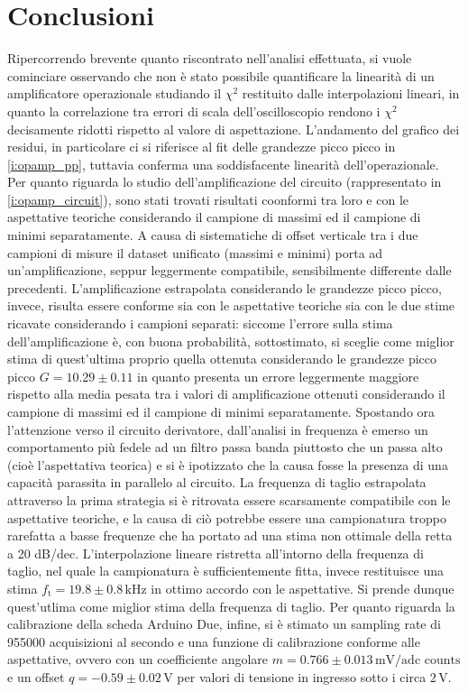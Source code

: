 \documentclass[a4paper,11pt]{article} %
\begin{document}
\section{Conclusioni}
Ripercorrendo brevente quanto riscontrato nell'analisi effettuata, si vuole cominciare osservando che non è stato
possibile quantificare la linearità di un amplificatore operazionale studiando il $\chi^2$ restituito dalle
interpolazioni lineari, in quanto la correlazione tra errori di scala dell'oscilloscopio rendono i $\chi^2$ decisamente
ridotti rispetto al valore di aspettazione. L'andamento del grafico dei residui, in particolare ci si riferisce al fit
delle grandezze picco picco in \autoref{i:opamp_pp}, tuttavia conferma una soddisfacente linearità dell'operazionale.
Per quanto riguarda lo studio dell'amplificazione del circuito (rappresentato in \autoref{i:opamp_circuit}), sono stati
trovati risultati coonformi tra loro e con le aspettative teoriche considerando il campione di massimi ed il campione di
minimi separatamente. A causa di sistematiche di offset verticale tra i due campioni di misure il dataset unificato
(massimi e minimi) porta ad un'amplificazione, seppur leggermente compatibile, sensibilmente differente dalle
precedenti. L'amplificazione estrapolata considerando le grandezze picco picco, invece, risulta essere conforme sia con
le aspettative teoriche sia con le due stime ricavate considerando i campioni separati: siccome l'errore sulla stima
dell'amplificazione è, con buona probabilità, sottostimato, si sceglie come miglior stima di quest'ultima proprio quella
ottenuta considerando le grandezze picco picco $G=10.29 \pm 0.11$ in quanto presenta un errore leggermente maggiore
rispetto alla media pesata tra i valori di amplificazione ottenuti considerando il campione di massimi ed il campione di
minimi separatamente. Spostando ora l'attenzione verso il circuito derivatore, dall'analisi in frequenza è emerso un
comportamento più fedele ad un filtro passa banda piuttosto che un passa alto (cioè l'aspettativa teorica) e si è
ipotizzato che la causa fosse la presenza di una capacità parassita in parallelo al circuito. La frequenza di taglio
estrapolata attraverso la prima strategia si è ritrovata essere scarsamente compatibile con le aspettative teoriche, e
la causa di ciò potrebbe essere una campionatura troppo rarefatta a basse frequenze che ha portato ad una stima non
ottimale della retta a 20 dB/dec. L'interpolazione lineare ristretta all'intorno della frequenza di taglio, nel quale la
campionatura è sufficientemente fitta, invece restituisce una stima $f_{\text{t}}=19.8 \pm 0.8\,\si{\kHz}$ in ottimo
accordo con le aspettative. Si prende dunque quest'utlima come miglior stima della frequenza di taglio. Per quanto
riguarda la calibrazione della scheda Arduino Due, infine, si è stimato un sampling rate di 955000 acquisizioni al
secondo e una funzione di calibrazione conforme alle aspettative, ovvero con un coefficiente angolare $m=0.766\pm
0.013\,\text{mV/adc counts}$ e un offset $q=-0.59\pm0.02\,\si{\volt}$ per valori di tensione in ingresso sotto i circa
$2\,\si{\volt}$.
\end{document}
